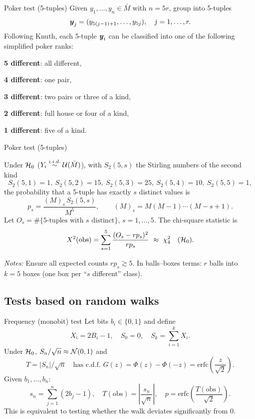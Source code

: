 \documentclass[aspectratio=169]{beamer}
\begin{document}


\begin{frame}{Poker test (5-tuples)}
Given $y_1,\ldots,y_n\in\bar{M}$ with $n=5r$, group into 5-tuples
\[
\mbox{\boldmath$y$}_j=(y_{5(j-1)+1},\ldots,y_{5j}),\quad j=1,\ldots,r.
\]
Following Knuth, each 5-tuple \( \mbox{\boldmath$y$}_i \) can be classified into one of the following simplified poker ranks:
\begin{description}
    \item \textbf{5 different}: all different,
    \item \textbf{4 different}: one pair,
    \item \textbf{3 different}: two pairs or three of a kind,
    \item \textbf{2 different}: full house or four of a kind,
    \item \textbf{1 different}: five of a kind.
\end{description}


\end{frame}




\begin{frame}{Poker test (5-tuples)}


Under ${\cal H}_0$ ($Y_i\stackrel{i.i.d.}{\sim}{\cal U}(\bar{M})$), with $S_2(5,s)$ the Stirling numbers of the second kind
\[
S_2(5,1)=1,\ S_2(5,2)=15,\ S_2(5,3)=25,\ S_2(5,4)=10,\ S_2(5,5)=1,
\]
the probability that a 5-tuple has exactly $s$ distinct values is
\[
p_s=\frac{(M)_s\,S_2(5,s)}{M^5},\qquad (M)_s=M(M-1)\cdots(M-s+1).
\]
\pause
Let $O_s=\#\{\text{5-tuples with }s\text{ distinct}\}$, $s=1,\ldots,5$. The chi-square statistic is
\[
X^2(\text{obs})=\sum_{s=1}^5\frac{(O_s-rp_s)^2}{rp_s}\ \approx\ \chi^2_{4}\quad(\calH_0).
\]

\smallskip
\textit{Notes:} Ensure all expected counts $rp_s\gtrsim 5$. In balls–boxes terms: $r$ balls into $k=5$ boxes (one box per “$s$ different” class).
\end{frame}




\subsection{Tests based on random walks}

\begin{frame}{Frequency (monobit) test}
Let bits $b_i\in\{0,1\}$ and define
\[
X_i = 2B_i - 1,\quad S_0=0,\quad S_k=\sum_{i=1}^k X_i.
\]
\pause
Under ${\cal H}_0$, $S_n/\sqrt{n}\approx{\cal N}(0,1)$ and
\[
T=|S_n|/\sqrt{n}\quad\text{has c.d.f. }G(z)=\Phi(z)-\Phi(-z)
      =\mathrm{erfc}\!\left(\frac{z}{\sqrt{2}}\right).
\]
Given $b_1,\ldots,b_n$:
\[
s_n=\sum_{j=1}^n(2b_j-1),\quad
T(\mathrm{obs})=\left|\frac{s_n}{\sqrt{n}}\right|,\quad
p=\mathrm{erfc}\!\left(\frac{T(\mathrm{obs})}{\sqrt{2}}\right).
\]
\vspace{-1ex}
This is equivalent to testing whether the walk deviates significantly from $0$.
\end{frame}
\end{document}
